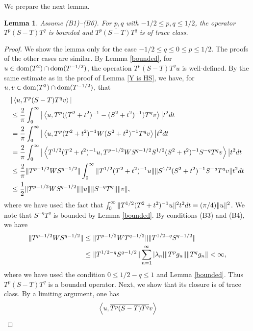 \documentclass[12pt]{article}
\theoremstyle{plain}
\newtheorem{lem}[theorem]{\bf Lemma}
\numberwithin{equation}{section}
\theoremstyle{remark}
\begin{document}
We prepare the next lemma.
\begin{lem}{\label{tr lem}}
Assume (B1)--(B6).
For $p,q$ with $-1/2\leq p,q\leq 1/2$, the operator $T^p(S-T)T^q$ is bounded and $\overline{T^p(S-T)T^q}$ is of trace class. 
\end{lem}
\begin{proof}
We show the lemma only for the case $-1/2\leq q\leq 0 \leq p\leq 1/2$.
The proofs of the other cases are similar.
By Lemma \ref{bounded}, for $u\in \mathop{\mathrm{dom}}(T^2)\cap \mathop{\mathrm{dom}}(T^{-1/2})$, the operation $T^p(S-T)T^qu$ is well-defined.
  By the same estimate as in the proof of Lemma \ref{Y is HS}, we have, for $u, v\in \mathop{\mathrm{dom}}(T^2)\cap \mathop{\mathrm{dom}}(T^{-1/2})$, that
\begin{align*}
& |\left\langle u,T^p(S-T)T^q v\right\rangle|  \\
&\leq \frac{2}{\pi}\int_0^\infty \big| \left\langle u,T^p ((T^2+t^2)^{-1}-(S^2+t^2)^{-1})T^q v\right\rangle \big| t^2dt \\
&= \frac{2}{\pi}\int_0^\infty \big| \left\langle u,T^p (T^2+t^2)^{-1}W(S^2+t^2)^{-1} T^q v\right\rangle \big| t^2dt \\
&= \frac{2}{\pi}\int_0^\infty \big| \left\langle T^{1/2}(T^2+t^2)^{-1}u,T^{p-1/2} WS^{q-1/2} S^{1/2}(S^2+t^2)^{-1} S^{-q}T^q v\right\rangle \big| t^2dt \\
&\leq \frac{2}{\pi} \| T^{p-1/2} WS^{q-1/2} \| \int_0^\infty \| T^{1/2}(T^2+t^2)^{-1}u \| \| S^{1/2}(S^2+t^2)^{-1} S^{-q}T^q v \|  t^2dt \\
&\leq \frac{1}{2} \| T^{p-1/2} WS^{q-1/2} \| \| u \| \| S^{-q}T^q \| \| v \|,
\end{align*}
where we have used the fact that $\int_0^\infty \| T^{1/2}(T^2+t^2)^{-1}u \|^2t^2dt = (\pi/4)\| u \|^2$.
We note that $S^{-q}T^q$ is bounded by Lemma \ref{bounded}.
By conditions (B3) and (B4), we have
\begin{align*}
 \| T^{p-1/2} WS^{q-1/2} \| 
& \leq \| T^{p-1/2} WT^{q-1/2} \| \| T^{1/2-q}S^{q-1/2} \| \notag \\
& \leq \| T^{1/2-q}S^{q-1/2} \| \sum_{n=1}^\infty |\lambda_n| \| T^pg_n \| \| T^qg_n \| < \infty, 
\end{align*}
where we have used the condition $0\leq 1/2 - q \leq 1$ and Lemma \ref{bounded}.
Thus $T^p(S-T)T^q$ is a bounded operator. Next, we show that its closure is of trace class.
By a limiting argument, one has
\begin{align}
& \inner{u}{\overline{T^p(S-T)T^q}v} \notag\\

\end{align}
\end{proof}
\end{document}
